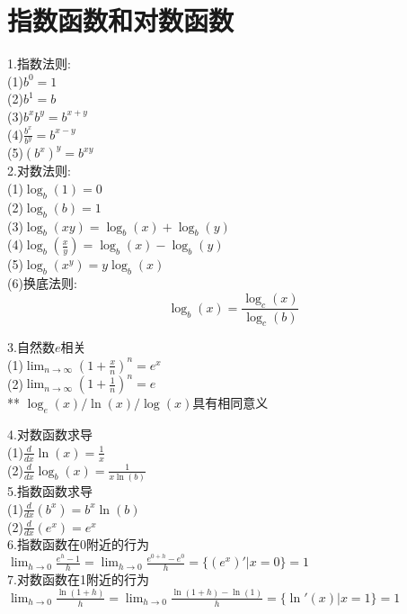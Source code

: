 \chapter{指数函数和对数函数}
1.指数法则:\\
(1)\quad$b^0=1$\\
(2)\quad$b^1=b$\\
(3)\quad$b^xb^y=b^{x+y}$\\[1ex]
(4)\quad$\displaystyle\frac{b^x}{b^y}=b^{x-y}$\\[1ex]
(5)\quad$(b^x)^y=b^{xy}$\\

2.对数法则:\\
(1)\quad$\log_b(1)=0$\\
(2)\quad$\log_b(b)=1$\\
(3)\quad$\log_b(xy)=\log_b(x)+\log_b(y)$\\[1ex]
(4)\quad$\displaystyle\log_b(\frac{x}{y})=\log_b(x)-\log_b(y)$\\[1ex]
(5)\quad$\log_b(x^y)=y\log_b(x)$\\
(6)\quad 换底法则:
\[\log_b(x)=\frac{\log_c(x)}{\log_c(b)}\]

3.自然数$e$相关\\[1ex]
(1)\quad$\displaystyle\lim_{n\to\infty}(1+\frac{x}{n})^n=e^x$\\[1ex]
(2)\quad$\displaystyle\lim_{n\to\infty}(1+\frac{1}{n})^n=e$\\[1ex]
** $\log_e(x)/\ln(x)/\log(x)$具有相同意义

4.对数函数求导\\[1ex]
(1)\quad$\displaystyle\frac{d}{dx}\ln(x)=\frac{1}{x}$\\[1ex]
(2)\quad$\displaystyle\frac{d}{dx}\log_b(x)=\frac{1}{x\ln(b)}$\\[1ex]

5.指数函数求导\\[1ex]
(1)\quad$\displaystyle\frac{d}{dx}(b^x)=b^x\ln(b)$\\[1ex]
(2)\quad$\displaystyle\frac{d}{dx}(e^x)=e^x$\\[1ex]

6.指数函数在0附近的行为\\[1ex]
$\displaystyle\lim_{h\to 0}\frac{e^h-1}{h}=\lim_{h\to 0}\frac{e^{0+h}-e^0}{h}=\{(e^x)'|x=0\}=1$\\[1ex]

7.对数函数在1附近的行为\\[1ex]
$\displaystyle\lim_{h\to 0}\frac{\ln(1+h)}{h}=\lim_{h\to 0}\frac{\ln(1+h)-\ln(1)}{h}=\{\ln'(x)|x=1\}=1$\\[1ex]

